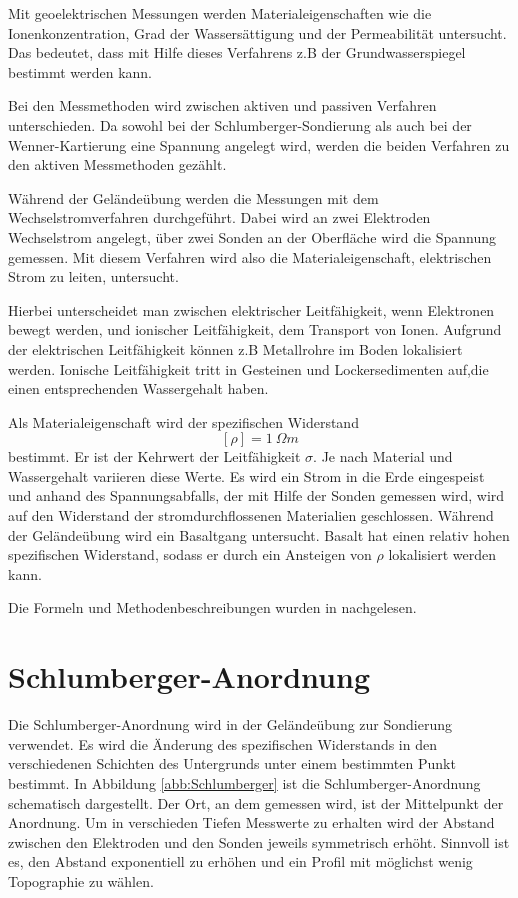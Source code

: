 Mit geoelektrischen Messungen werden Materialeigenschaften wie die Ionenkonzentration, Grad der Wassersättigung und der Permeabilität untersucht. 
Das bedeutet, dass mit Hilfe dieses Verfahrens z.B der Grundwasserspiegel bestimmt werden kann.

Bei den Messmethoden wird zwischen aktiven und passiven Verfahren unterschieden.  Da sowohl bei der Schlumberger-Sondierung als auch bei der Wenner-Kartierung eine Spannung angelegt wird, werden die beiden Verfahren zu den aktiven Messmethoden gezählt.

Während der Geländeübung werden die Messungen mit dem Wechselstromverfahren durchgeführt. Dabei wird an zwei Elektroden Wechselstrom angelegt,
über zwei Sonden an der Oberfläche wird die Spannung gemessen. Mit diesem Verfahren wird also die Materialeigenschaft, elektrischen Strom zu leiten, untersucht.

Hierbei unterscheidet man zwischen elektrischer Leitfähigkeit, wenn Elektronen bewegt werden, und ionischer Leitfähigkeit, dem Transport von Ionen. 
Aufgrund der elektrischen Leitfähigkeit können z.B Metallrohre im Boden lokalisiert werden. Ionische Leitfähigkeit tritt in Gesteinen und Lockersedimenten auf,die einen entsprechenden Wassergehalt haben.

Als Materialeigenschaft wird der spezifischen Widerstand $$[\rho] = \SI{1}{\Omega m}$$ bestimmt. Er ist der Kehrwert der Leitfähigkeit $\sigma$. Je nach Material und Wassergehalt variieren diese Werte. Es wird ein Strom in die Erde eingespeist und anhand des Spannungsabfalls, der mit Hilfe der Sonden gemessen wird, wird auf den Widerstand der stromdurchflossenen Materialien geschlossen. Während der Geländeübung wird ein Basaltgang untersucht. Basalt hat einen relativ hohen spezifischen Widerstand, sodass er durch ein Ansteigen  von $ \rho$ lokalisiert werden kann.

Die Formeln und Methodenbeschreibungen wurden in \cite{skript} nachgelesen.

\section{Schlumberger-Anordnung}

Die Schlumberger-Anordnung wird in der Geländeübung zur Sondierung verwendet. Es wird die Änderung des spezifischen Widerstands in den verschiedenen Schichten des Untergrunds unter einem bestimmten Punkt bestimmt. In Abbildung \ref{abb:Schlumberger} ist die Schlumberger-Anordnung schematisch dargestellt. Der Ort, an dem gemessen wird, ist der Mittelpunkt der Anordnung. Um in verschieden Tiefen Messwerte zu erhalten wird der Abstand zwischen den Elektroden und den Sonden jeweils symmetrisch erhöht. Sinnvoll ist es, den Abstand exponentiell zu erhöhen und ein Profil mit möglichst wenig Topographie zu wählen.


